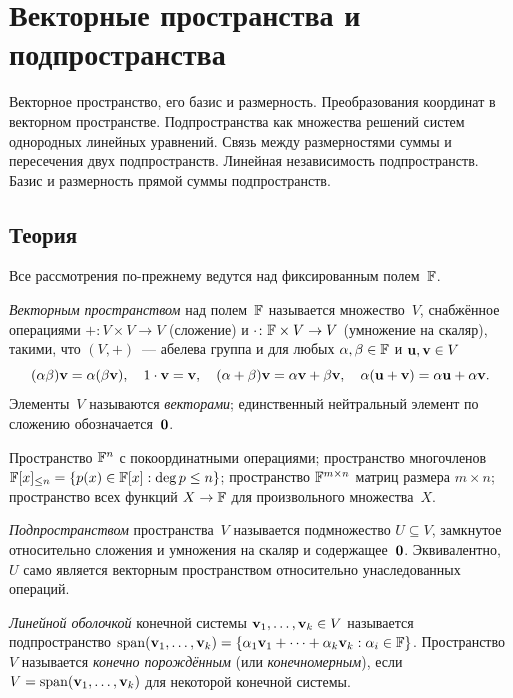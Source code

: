 
\section{Векторные пространства и подпространства}
\label{sec:1.1.04-vector-spaces}

\begin{ticket}
Векторное пространство, его базис и размерность. Преобразования координат в векторном пространстве. Подпространства как множества решений систем однородных линейных уравнений. Связь между размерностями суммы и пересечения двух подпространств. Линейная независимость подпространств. Базис и размерность прямой суммы подпространств.
\end{ticket}

\subsection*{Теория}

Все рассмотрения по-прежнему ведутся над фиксированным полем~$\mathbb{F}$.

\begin{definition}
\label{def:vector-space}
\emph{Векторным пространством} над полем~$\mathbb{F}$ называется множество~$V$,
снабжённое операциями
$+\colon V \times V \to V$ (сложение) и
$\cdot\colon \mathbb{F} \times V \to V$ (умножение на скаляр), такими, что
$(V, +)$~--- абелева группа и для любых $\alpha, \beta \in \mathbb{F}$ и
$\mathbf{u}, \mathbf{v} \in V$
\[
  (\alpha \beta)\mathbf{v} = \alpha(\beta \mathbf{v}), \quad
  1 \cdot \mathbf{v} = \mathbf{v}, \quad
  (\alpha + \beta)\mathbf{v} = \alpha \mathbf{v} + \beta \mathbf{v}, \quad
  \alpha(\mathbf{u} + \mathbf{v}) = \alpha \mathbf{u} + \alpha \mathbf{v}.
\]
Элементы~$V$ называются \emph{векторами}; единственный нейтральный
элемент по сложению обозначается~$\mathbf{0}$.
\end{definition}

\begin{example}
\label{ex:vector-space-examples}
Пространство $\mathbb{F}^n$ с покоординатными операциями; пространство
многочленов $\mathbb{F}[x]_{\le n} = \{p(x) \in \mathbb{F}[x] : \deg p \le n\}$;
пространство $\mathbb{F}^{m \times n}$ матриц размера $m \times n$;
пространство всех функций $X \to \mathbb{F}$ для произвольного множества~$X$.
\end{example}

\begin{definition}
\label{def:subspace}
\emph{Подпространством} пространства~$V$ называется подмножество
$U \subseteq V$, замкнутое относительно сложения и умножения на скаляр
и содержащее~$\mathbf{0}$. Эквивалентно, $U$ само является векторным
пространством относительно унаследованных операций.

\emph{Линейной оболочкой} конечной системы
$\mathbf{v}_1, \dots, \mathbf{v}_k \in V$ называется подпространство
$\operatorname{span}(\mathbf{v}_1, \dots, \mathbf{v}_k) = \{\alpha_1 \mathbf{v}_1 + \dots + \alpha_k \mathbf{v}_k : \alpha_i \in \mathbb{F}\}$.
Пространство~$V$ называется \emph{конечно порождённым}
(или \emph{конечномерным}), если $V = \operatorname{span}(\mathbf{v}_1, \dots, \mathbf{v}_k)$
для некоторой конечной системы.
\end{definition}

